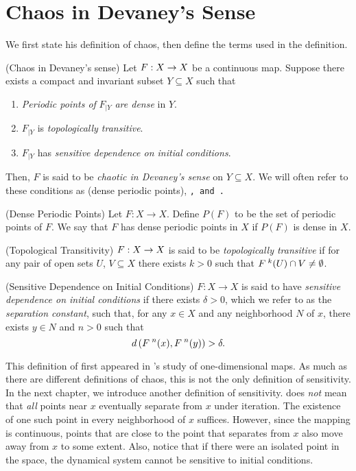 \documentclass[10pt,draft,twoside]{book}
\begin{document}
\section{Chaos in Devaney's Sense}
We first state his definition of chaos, then define the terms used in the definition.
\begin{definition}
  (Chaos in Devaney's sense) 
  Let $F: X\rightarrow X$ be a continuous map.
  Suppose there exists a compact and invariant subset $Y \subseteq X$ such that
  \begin{enumerate}
    \item \textit{Periodic points of} $F_{|Y}$ \textit{are dense} in $Y$.
    \item $F_{|Y}$ is \textit{topologically transitive}.
    \item $F_{|Y}$ has \textit{sensitive dependence on initial conditions}.
  \end{enumerate}
  Then, $F$ is said to be \textit{chaotic in Devaney's sense} on $Y \subseteq X$.
  We will often refer to these conditions as \dpp (dense periodic points), \tt, and \sdic.
\end{definition}
%
\begin{definition}
  (Dense Periodic Points) 
  Let $F: X \to X$.
  Define $P(F)$ to be the set of periodic points of $F$.
  We say that $F$ has dense periodic points in $X$ if $P(F)$ is dense in $X$.
\end{definition}
%
\begin{definition}
  (Topological Transitivity) 
  $F: X \rightarrow X$ is said to be \textit{topologically transitive} if for any pair of open sets $U$, $V \subseteq X$ there exists $k > 0$ such that $F^{\;k}(U) \cap V \neq \emptyset$.
  \label{defn:transitivity}
   \end{definition}
%
\begin{definition}
  (Sensitive Dependence on Initial Conditions) 
  $F: X \rightarrow X$ is said to have \textit{sensitive dependence on initial conditions} if there exists $\delta > 0$, which we refer to as the \textit{separation constant}, such that, for any $x \in X$ and any neighborhood $N$ of $x$, there exists $y\in N$ and $n > 0$ such that 
  \begin{equation*}
    d\left( F^{\;n}(x), F^{\;n}(y) \right) > \delta.
  \end{equation*}
  \label{defn:sdic}
\end{definition}
%
This definition of \sdic first appeared in \citet{guckenheimer}'s study of one-dimensional maps.
As much as there are different definitions of chaos, this is not the only definition of sensitivity.
In the next chapter, we introduce another definition of sensitivity.
\sdic does \textit{not} mean that \textit{all} points near $x$ eventually separate from $x$ under iteration.
The existence of one such point in every neighborhood of $x$ suffices.
However, since the mapping is continuous, points that are close to the point that separates from $x$ also move away from $x$ to some extent.
Also, notice that if there were an isolated point in the space, the dynamical system cannot be sensitive to initial conditions.
\end{document}
